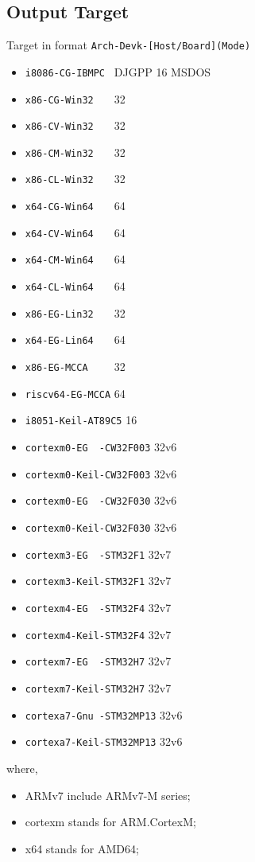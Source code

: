 

\subsection{Output Target}

Target in format \verb|Arch-Devk-[Host/Board](Mode)|

\begin{itemize}

\item \verb|i8086-CG-IBMPC | DJGPP 16 MSDOS
\item \verb|x86-CG-Win32   | 32
\item \verb|x86-CV-Win32   | 32
\item \verb|x86-CM-Win32   | 32
\item \verb|x86-CL-Win32   | 32
\item \verb|x64-CG-Win64   | 64
\item \verb|x64-CV-Win64   | 64
\item \verb|x64-CM-Win64   | 64
\item \verb|x64-CL-Win64   | 64
\item \verb|x86-EG-Lin32   | 32
\item \verb|x64-EG-Lin64   | 64
\item \verb|x86-EG-MCCA    | 32
\item \verb|riscv64-EG-MCCA| 64
\item \verb|i8051-Keil-AT89C5| 16
\item \verb|cortexm0-EG  -CW32F003| 32v6
\item \verb|cortexm0-Keil-CW32F003| 32v6
\item \verb|cortexm0-EG  -CW32F030| 32v6
\item \verb|cortexm0-Keil-CW32F030| 32v6
\item \verb|cortexm3-EG  -STM32F1| 32v7
\item \verb|cortexm3-Keil-STM32F1| 32v7
\item \verb|cortexm4-EG  -STM32F4| 32v7
\item \verb|cortexm4-Keil-STM32F4| 32v7
\item \verb|cortexm7-EG  -STM32H7| 32v7
\item \verb|cortexm7-Keil-STM32H7| 32v7
\item \verb|cortexa7-Gnu -STM32MP13| 32v6
\item \verb|cortexa7-Keil-STM32MP13| 32v6
\end{itemize}

where,

\begin{itemize}

\item ARMv7 include ARMv7-M series;
\item cortexm stands for ARM.CortexM;
\item x64 stands for AMD64;
\end{itemize}

